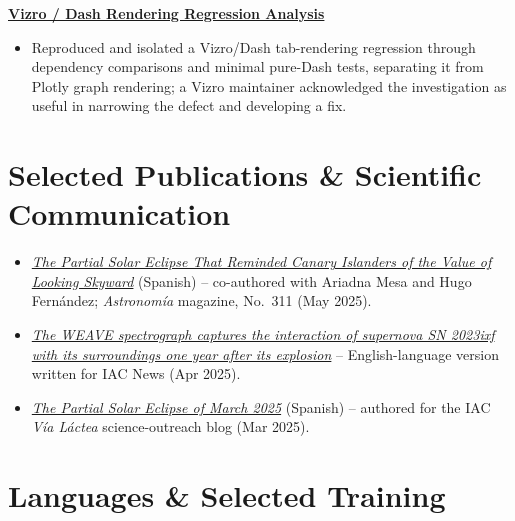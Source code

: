\documentclass[10pt,a4paper]{article}
\newcommand{\project}[1]{%
  \needspace{3\baselineskip}%
  \textbf{#1}\par\nopagebreak
  \vspace{0.06em}
}
\begin{document}
\project{\href{https://github.com/mckinsey/vizro/issues/1750\#issuecomment-4605773378}{Vizro / Dash Rendering Regression Analysis}}
\begin{itemize}
  \item Reproduced and isolated a Vizro/Dash tab-rendering regression through dependency comparisons and minimal pure-Dash tests, separating it from Plotly graph rendering; a Vizro maintainer acknowledged the investigation as useful in narrowing the defect and developing a fix.
\end{itemize}

\section{Selected Publications \& Scientific Communication}

\begin{itemize}
  \item \href{https://albertoreyescastro.github.io/assets/publications/Astronomy_Magazine.pdf}{\textit{The Partial Solar Eclipse That Reminded Canary Islanders of the Value of Looking Skyward}} (Spanish) -- co-authored with Ariadna Mesa and Hugo Fern\'andez; \textit{Astronom\'ia} magazine, No.~311 (May 2025).
  \item \href{https://www.iac.es/en/outreach/news/weave-spectrograph-captures-interaction-supernova-sn-2023ixf-its-surroundings-one-year-after-its-explosion}{\textit{The WEAVE spectrograph captures the interaction of supernova SN 2023ixf with its surroundings one year after its explosion}} -- English-language version written for IAC News (Apr 2025).
  \item \href{https://www.iac.es/es/blog/vialactea/2025/03/eclipse-solar-parcial-de-marzo-2025}{\textit{The Partial Solar Eclipse of March 2025}} (Spanish) -- authored for the IAC \textit{V\'ia L\'actea} science-outreach blog (Mar 2025).
\end{itemize}

\section{Languages \& Selected Training}
\end{document}
